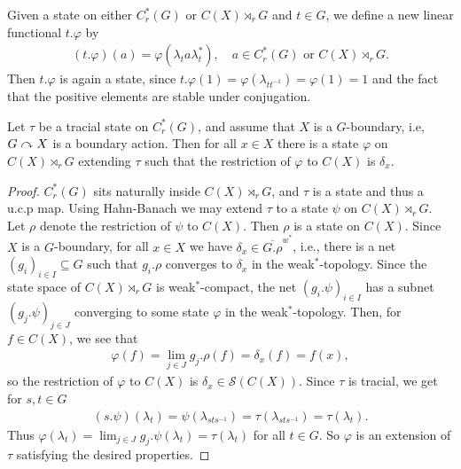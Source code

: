 Given a state on either $C_r^*(G)$ or $C(X) \rtimes_r G$ and $t \in G$, we define a new linear functional $t.\varphi$ by 
\begin{align*}
(t.\varphi)(a)=\varphi(\lambda_t a \lambda_t^*), \quad a \in C_r^*(G) \text{ or } C(X) \rtimes_r G.
\end{align*}
Then $t.\varphi$ is again a state, since $t.\varphi(1)=\varphi(\lambda_{t t^{-1}})=\varphi(1)=1$ and the fact that the positive elements are stable under conjugation.

\begin{lemma}\label{trace extend point restrict}
Let $\tau$ be a tracial state on $C_r^*(G)$, and assume that $X$ is a $G$-boundary, i.e, $G \curvearrowright X$ is a boundary action. Then for all  $x \in X$ there is a state $\varphi$ on $C(X) \rtimes_r G$ extending $\tau$ such that the restriction of $\varphi$ to $C(X)$ is $\delta_x$.
\begin{proof}
$C_r^*(G)$ sits naturally inside $C(X) \rtimes_r G$, and $\tau$ is a state and thus a u.c.p map. Using Hahn-Banach we may extend $\tau$ to a state $\psi$ on $C(X) \rtimes_r G$. Let $\rho$ denote the restriction of $\psi$ to $C(X)$. Then $\rho$ is a state on $C(X)$. Since $X$ is a $G$-boundary, for all $x \in X$ we have $\delta_x \in \overline{G. \rho}^{w^*}$, i.e., there is a net $(g_i)_{i \in I} \subseteq G$ such that $g_i. \rho$ converges to $\delta_x$ in the weak$^*$-topology. Since the state space of $C(X) \rtimes_r G$ is weak$^*$-compact, the net $(g_i.\psi)_{i \in I}$ has a subnet $(g_j.\psi)_{j \in J}$ converging to some state $\varphi$ in the weak$^*$-topology. Then, for $f \in C(X)$, we see that
\begin{align*}
\varphi(f)=\lim_{j \in J} g_j . \rho(f)=\delta_x (f)= f(x),
\end{align*}
so the restriction of $\varphi$ to $C(X)$ is $\delta_x \in \mathcal{S}(C(X))$. Since $\tau$ is tracial, we get for $s,t \in G$
\begin{align*}
(s.\psi)(\lambda_t)=\psi(\lambda_{sts^{-1}})=\tau(\lambda_{sts^{-1}})=\tau(\lambda_t).
\end{align*}
Thus $\varphi(\lambda_t)=\lim_{j \in J} g_j.\psi(\lambda_t)=\tau(\lambda_t)$ for all $t \in G$. So $\varphi$ is an extension of $\tau$ satisfying the desired properties.
\end{proof}
\end{lemma}

